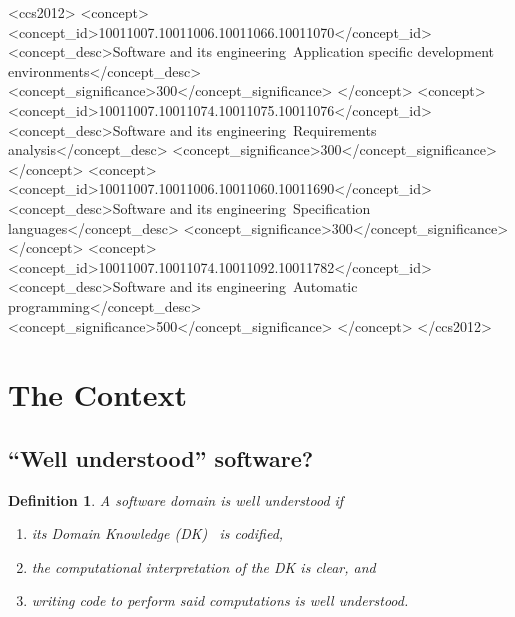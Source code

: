 \documentclass[sigconf,review,anonymous=false]{acmart}
\begin{document}
\begin{CCSXML}
<ccs2012>
   <concept>
       <concept_id>10011007.10011006.10011066.10011070</concept_id>
       <concept_desc>Software and its engineering~Application specific development environments</concept_desc>
       <concept_significance>300</concept_significance>
       </concept>
   <concept>
       <concept_id>10011007.10011074.10011075.10011076</concept_id>
       <concept_desc>Software and its engineering~Requirements analysis</concept_desc>
       <concept_significance>300</concept_significance>
       </concept>
   <concept>
       <concept_id>10011007.10011006.10011060.10011690</concept_id>
       <concept_desc>Software and its engineering~Specification languages</concept_desc>
       <concept_significance>300</concept_significance>
       </concept>
   <concept>
       <concept_id>10011007.10011074.10011092.10011782</concept_id>
       <concept_desc>Software and its engineering~Automatic programming</concept_desc>
       <concept_significance>500</concept_significance>
       </concept>
 </ccs2012>
\end{CCSXML}



\newtheorem{defn}{Definition}

\maketitle

\section{The Context}
\subsection{``Well understood'' software?}\label{ch:wellUnderstood}

\begin{defn}
A software domain is \emph{well understood} if
\begin{enumerate}
\item its Domain Knowledge (DK)~\cite{bjorner2021domaineng} is codified,
\item the computational interpretation of the DK is clear, and
\item writing code to perform said computations is well understood.
\end{enumerate}
\end{defn}
\end{document}
